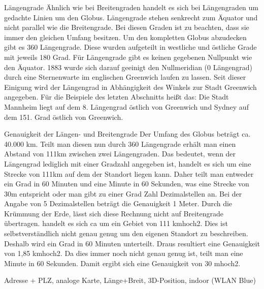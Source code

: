 Längengrade
Ähnlich wie bei Breitengraden handelt es sich bei Längengraden um gedachte Linien um den Globus. Längengrade stehen  senkrecht zum Äquator und nicht parallel wie die Breitengrade. Bei diesen Graden ist zu beachten, dass sie immer den gleichen Umfang besitzen. Um den kompletten Globus abzudecken gibt es 360 Längengrade. Diese wurden aufgeteilt in westliche und östliche Grade mit jeweils 180 Grad. Für Längengrade gibt es keinen gegebenen Nullpunkt wie den Äquator. 1883 wurde sich darauf geeinigt den Nullmeridian (0 Längengrad) durch eine Sternenwarte im englischen Greenwich laufen zu lassen. Seit dieser Einigung wird der Längengrad in Abhängigkeit des Winkels zur Stadt Greenwich angegeben. 
Für die Beispiele des letzten Abschnitts heißt das: Die Stadt Mannheim liegt auf dem 8. Längengrad östlich von Greenwich und Sydney auf dem 151. Grad östlich von Greenwich.

Genauigkeit der Längen- und Breitengrade
Der Umfang des Globus beträgt ca. 40.000 km. Teilt man diesen nun durch 360 Längengrade erhält man einen Abstand von 111km zwischen zwei Längengraden. Das bedeutet, wenn der Längengrad lediglich mit einer Gradzahl angegeben ist, handelt es sich um eine Strecke von 111km auf dem der Standort liegen kann. Daher teilt man entweder ein Grad in 60 Minuten und eine Minute in 60 Sekunden, was eine Strecke von 30m entspricht oder man gibt zu einer Grad Zahl Dezimalstellen an. Bei der Angabe von 5 Dezimalstellen beträgt die Genauigkeit 1 Meter.
Durch die Krümmung der Erde, lässt sich diese Rechnung nicht auf Breitengrade übertragen. 
handelt es sich ca um ein Gebiet von 111 kmhoch2. Dies ist selbstverständlich nicht genau genug um den eigenen Standort zu beschreiben. Deshalb wird ein Grad in 60 Minuten unterteilt. Draus resultiert eine Genauigkeit von 1,85 kmhoch2. Da dies immer noch nicht genau genug ist, teilt man eine Minute in 60 Sekunden. Damit ergibt sich eine Genauigkeit von 30 mhoch2. 


Adresse + PLZ, analoge Karte, Länge+Breit, 3D-Position, indoor (WLAN Blue)